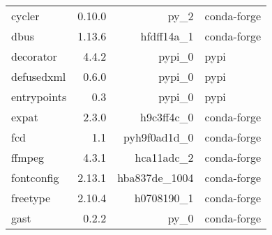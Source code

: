 \begin{table}
\begin{center}
\begin{tabular}{|l|r|r|l|}
			cycler &0.10.0 & py\_2 &conda-forge \\
			dbus &1.13.6 & hfdff14a\_1 &conda-forge \\
			decorator &4.4.2 & pypi\_0 &pypi \\
			defusedxml &0.6.0 & pypi\_0 &pypi \\
			entrypoints &0.3 & pypi\_0 &pypi \\
			expat &2.3.0 & h9c3ff4c\_0 &conda-forge \\
			fcd &1.1 & pyh9f0ad1d\_0 &conda-forge \\
			ffmpeg &4.3.1 & hca11adc\_2 &conda-forge \\
			fontconfig &2.13.1 & hba837de\_1004 &conda-forge \\
			freetype &2.10.4 & h0708190\_1 &conda-forge \\
			gast &0.2.2 & py\_0 &conda-forge \\
			
		\end{tabular}
	\end{center}
\end{table}

